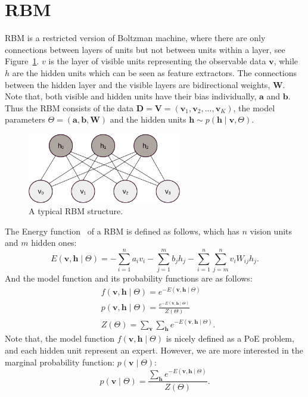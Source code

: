 \section{RBM}
RBM is a restricted version of Boltzman machine, where there are only connections between layers of units but not between units within a layer, see Figure~\ref{fig:RBM}.
$ v $ is the layer of visible units representing the observable data $ \mathbf{v} $, while $ h $ are the hidden units which can be seen as feature extractors.
The connections between the hidden layer and the visible layers are bidirectional weights, $ \mathbf{W} $.
Note that, both visible and hidden units have their bias individually, $ \mathbf{a} $ and $ \mathbf{b} $.
Thus the RBM consists of the data $ \mathbf{D} = \mathbf{V} = (\mathbf{v}_1, \mathbf{v}_2, ..., \mathbf{v}_K ) $, the model parameters $ \Theta = (\mathbf{a}, \mathbf{b}, \mathbf{W}) $ and the hidden units $ \mathbf{h} \sim p(\mathbf{h} \mid \mathbf{v}, \Theta) $.
\begin{figure}[hbt]
	\centering
	\includegraphics[width=0.6\textwidth]{pics_sdbn/RBM.pdf}
	\caption{A typical RBM structure.}
	\label{fig:RBM}
\end{figure}

The Energy function~\cite{hopfield1982neural} of a RBM is defined as follows, which has $ n $ vision units and $ m $ hidden ones:
\begin{equation}
E(\mathbf{v}, \mathbf{h} \mid \Theta)= -\sum_{i=1}^n a_i v_i - \sum_{j=1}^m b_j h_j - \sum_{i=1}^n \sum_{j=m}^n v_i W_{ij} h_j.
\end{equation}
And the model function and its probability functions are as follows:
\begin{equation}
\begin{aligned}
& f(\mathbf{v}, \mathbf{h} \mid \Theta) =e^{-E(\mathbf{v}, \mathbf{h} \mid \Theta)} \\
& p(\mathbf{v}, \mathbf{h} \mid \Theta) =\frac{e^{-E(\mathbf{v}, \mathbf{h} \mid \Theta)}}{Z(\Theta)}\\
& Z(\Theta) = \sum_{\mathbf{v}} \sum_{\mathbf{h}} e^{-E(\mathbf{v}, \mathbf{h} \mid \Theta)}.
\end{aligned}
\end{equation}
Note that, the model function $ f(\mathbf{v}, \mathbf{h} \mid \Theta) $ is nicely defined as a PoE problem, and each hidden unit represent an expert.
However, we are more interested in the marginal probability function: $ p(\mathbf{v} \mid \Theta) $:
\begin{equation}
p(\mathbf{v} \mid \Theta) =\frac{\sum_{ \mathbf{h}} e^{-E(\mathbf{v}, \mathbf{h} \mid \Theta)}}{Z(\Theta)}.
\end{equation}	

